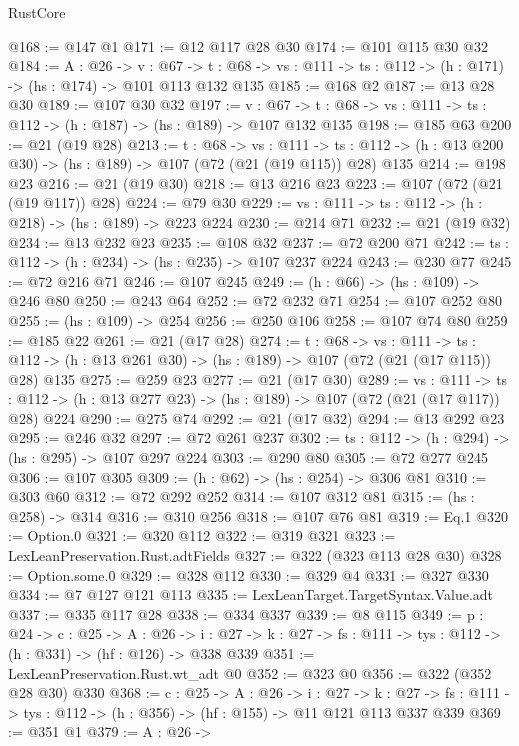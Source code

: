 \begin{lexlean}{RustCore}
\begin{coremodule}
@168 := @147 @1
@171 := @12 @117 @28 @30
@174 := @101 @115 @30 @32
@184 := {A : @26} ->
  {v : @67} ->
  {t : @68} -> {vs : @111} -> {ts : @112} -> (h : @171) -> (hs : @174) -> @101 @113 @132 @135
@185 := @168 @2
@187 := @13 @28 @30
@189 := @107 @30 @32
@197 := {v : @67} ->
  {t : @68} -> {vs : @111} -> {ts : @112} -> (h : @187) -> (hs : @189) -> @107 @132 @135
@198 := @185 @63
@200 := @21 (@19 @28)
@213 := {t : @68} ->
  {vs : @111} ->
  {ts : @112} -> (h : @13 @200 @30) -> (hs : @189) -> @107 (@72 (@21 (@19 @115)) @28) @135
@214 := @198 @23
@216 := @21 (@19 @30)
@218 := @13 @216 @23
@223 := @107 (@72 (@21 (@19 @117)) @28)
@224 := @79 @30
@229 := {vs : @111} -> {ts : @112} -> (h : @218) -> (hs : @189) -> @223 @224
@230 := @214 @71
@232 := @21 (@19 @32)
@234 := @13 @232 @23
@235 := @108 @32
@237 := @72 @200 @71
@242 := {ts : @112} -> (h : @234) -> (hs : @235) -> @107 @237 @224
@243 := @230 @77
@245 := @72 @216 @71
@246 := @107 @245
@249 := (h : @66) -> (hs : @109) -> @246 @80
@250 := @243 @64
@252 := @72 @232 @71
@254 := @107 @252 @80
@255 := (hs : @109) -> @254
@256 := @250 @106
@258 := @107 @74 @80
@259 := @185 @22
@261 := @21 (@17 @28)
@274 := {t : @68} ->
  {vs : @111} ->
  {ts : @112} -> (h : @13 @261 @30) -> (hs : @189) -> @107 (@72 (@21 (@17 @115)) @28) @135
@275 := @259 @23
@277 := @21 (@17 @30)
@289 := {vs : @111} ->
  {ts : @112} -> (h : @13 @277 @23) -> (hs : @189) -> @107 (@72 (@21 (@17 @117)) @28) @224
@290 := @275 @74
@292 := @21 (@17 @32)
@294 := @13 @292 @23
@295 := @246 @32
@297 := @72 @261 @237
@302 := {ts : @112} -> (h : @294) -> (hs : @295) -> @107 @297 @224
@303 := @290 @80
@305 := @72 @277 @245
@306 := @107 @305
@309 := (h : @62) -> (hs : @254) -> @306 @81
@310 := @303 @60
@312 := @72 @292 @252
@314 := @107 @312 @81
@315 := (hs : @258) -> @314
@316 := @310 @256
@318 := @107 @76 @81
@319 := Eq.{1}
@320 := Option.{0}
@321 := @320 @112
@322 := @319 @321
@323 := LexLeanPreservation.Rust.adtFields
@327 := @322 (@323 @113 @28 @30)
@328 := Option.some.{0}
@329 := @328 @112
@330 := @329 @4
@331 := @327 @330
@334 := @7 @127 @121 @113
@335 := LexLeanTarget.TargetSyntax.Value.adt
@337 := @335 @117 @28
@338 := @334 @337
@339 := @8 @115
@349 := {p : @24} ->
  {c : @25} ->
  {A : @26} ->
  {i : @27} -> {k : @27} -> {fs : @111} -> {tys : @112} -> (h : @331) -> (hf : @126) -> @338 @339
@351 := LexLeanPreservation.Rust.wt_adt @0
@352 := @323 @0
@356 := @322 (@352 @28 @30) @330
@368 := {c : @25} ->
  {A : @26} ->
  {i : @27} ->
  {k : @27} -> {fs : @111} -> {tys : @112} -> (h : @356) -> (hf : @155) -> @11 @121 @113 @337 @339
@369 := @351 @1
@379 := {A : @26} ->

\end{coremodule}
\end{lexlean}
